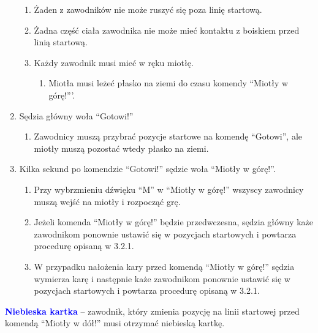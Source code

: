 \documentclass[12pt]{article}
\newcommand\bluecard[1]{\bgroup\textcolor{blue}{\textbf{#1}}}
\begin{document}
\begin{enumerate}
	      \begin{enumerate}
		      \item
		            Żaden z zawodników nie może ruszyć się poza linię startową.
		      \item
		            Żadna część ciała zawodnika nie może mieć kontaktu z boiskiem przed
		            linią startową.
		      \item
		            Każdy zawodnik musi mieć w ręku miotłę.

		            \begin{enumerate}
			            \item
			                  Miotła musi leżeć płasko na ziemi do czasu komendy ``Miotły w
			                  górę!'''.
		            \end{enumerate}
	      \end{enumerate}
	\item
	      Sędzia główny woła ``Gotowi!''

	      \begin{enumerate}
		      \item
		            Zawodnicy muszą przybrać pozycje startowe na komendę ``Gotowi'', ale
		            miotły muszą pozostać wtedy płasko na ziemi.
	      \end{enumerate}
	\item
	      Kilka sekund po komendzie ``Gotowi!'' sędzie woła ``Miotły w górę!''.

	      \begin{enumerate}
		      \item
		            Przy wybrzmieniu dźwięku ``M'' w ``Miotły w górę!'' wszyscy
		            zawodnicy muszą wejść na miotły i rozpocząć grę.
		      \item
		            Jeżeli komenda ``Miotły w górę!'' będzie przedwczesna, sędzia główny
		            każe zawodnikom ponownie ustawić się w pozycjach startowych i
		            powtarza procedurę opisaną w 3.2.1.
		      \item
		            W przypadku nałożenia kary przed komendą ``Miotły w górę!'' sędzia
		            wymierza karę i następnie każe zawodnikom ponownie ustawić się w
		            pozycjach startowych i powtarza procedurę opisaną w 3.2.1.
	      \end{enumerate}
\end{enumerate}

\bluecard{Niebieska kartka} -- zawodnik, który zmienia pozycję na linii
startowej przed komendą ``Miotły w dół!'' musi otrzymać niebieską
kartkę.
\end{document}
